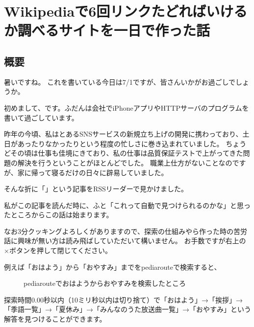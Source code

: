 \section{Wikipediaで6回リンクたどればいけるか調べるサイトを一日で作った話}
\subsection{概要}
暑いですね。
これを書いている今日は7/1ですが、皆さんいかがお過ごしでしょうか。

初めまして、です。ふだんは会社でiPhoneアプリやHTTPサーバのプログラムを書いて過ごしています。

昨年の今頃、私はとあるSNSサービスの新規立ち上げの開発に携わっており、土日があったりなかったりという程度の忙しさに巻き込まれていました。
ちょうどその頃は仕事も佳境にきており、私の仕事は品質保証テストで上がってきた問題の解決を行うということがほとんどでした。
職業上仕方がないことなのですが、家に帰って寝るだけの日々に辟易していました。

そんな折に「」という記事をRSSリーダーで見かけました。

私がこの記事を読んだ時に、ふと「これって自動で見つけられるのかな」と思ったところからこの話は始まります。

なお3分クッキングよろしくがありますので、探索の仕組みやら作った時の苦労話に興味が無い方は読み飛ばしていただいて構いません。
お手数ですが右上の×ボタンを押して閉じてください。

例えば「おはよう」から「おやすみ」までをpediarouteで検索すると、
\begin{figure}
  \centering
  \caption{pediarouteでおはようからおやすみを検索したところ}
\end{figure}
探索時間0.00秒以内（10ミリ秒以内は切り捨て）で「おはよう」→「挨拶」→「季語一覧」→「夏休み」→「みんなのうた放送曲一覧」→「おやすみ」という解答を見つけることができます。

